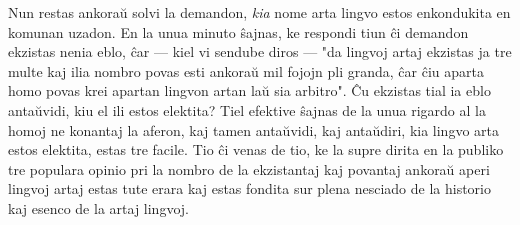    Nun restas ankora\u u solvi la demandon, {\sl kia} nome arta lingvo estos
enkondukita en komunan uzadon. En la unua minuto \^sajnas, ke
respondi tiun \^ci demandon ekzistas nenia eblo, \^car --- kiel vi
sendube diros --- "da lingvoj artaj ekzistas ja tre multe kaj ilia
nombro povas esti ankora\u u mil fojojn pli granda, \^car \^ciu
aparta homo povas krei apartan lingvon artan la\u u sia arbitro".
\^Cu ekzistas tial ia eblo anta\u uvidi, kiu el ili estos elektita?
Tiel efektive \^sajnas de la unua rigardo al la homoj ne konantaj la
aferon, kaj tamen anta\u uvidi, kaj anta\u udiri, kia lingvo arta
estos elektita, estas tre facile. Tio \^ci venas de tio, ke la supre
dirita en la publiko tre populara opinio pri la nombro de la
ekzistantaj kaj povantaj ankora\u u aperi lingvoj artaj estas tute
erara kaj estas fondita sur plena nesciado de la historio kaj esenco
de la artaj lingvoj.

